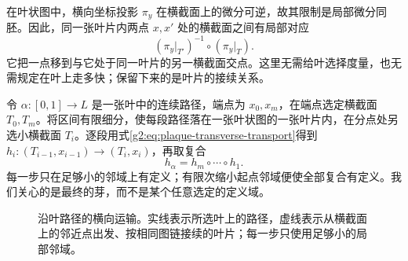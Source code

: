在叶状图中，横向坐标投影 \(\pi_y\) 在横截面上的微分可逆，故其限制是局部微分同胚。因此，同一张叶片内两点 \(x,x'\) 处的横截面之间有局部对应
\begin{equation}\label{g2:eq:plaque-transverse-transport}
	(\pi_y|_{T'})^{-1}\circ(\pi_y|_T).
\end{equation}
它把一点移到与它处于同一叶片的另一横截面交点。这里无需给叶选择度量，也无需规定在叶上走多快；保留下来的是叶片的接续关系。

\ProseParagraphBreak

令 \(\alpha:[0,1]\to L\) 是一张叶中的连续路径，端点为 \(x_0,x_m\)，在端点选定横截面 \(T_0,T_m\)。将区间有限细分，使每段路径落在一张叶状图的一张叶片内，在分点处另选小横截面 \(T_i\)。逐段用式\eqref{g2:eq:plaque-transverse-transport}得到 \(h_i:(T_{i-1},x_{i-1})\to(T_i,x_i)\)，再取复合
\[
	h_\alpha=h_m\circ\cdots\circ h_1.
\]
每一步只在足够小的邻域上有定义；有限次缩小起点邻域便使全部复合有定义。我们关心的是最终的芽，而不是某个任意选定的定义域。

\begin{figure}[htbp]
	\centering
	
	\caption[沿叶路径的横向运输]{沿叶路径的横向运输。实线表示所选叶上的路径，虚线表示从横截面上的邻近点出发、按相同图链接续的叶片；每一步只使用足够小的局部邻域。}
	\label{g2:fig:holonomy-transverse-transport}
\end{figure}

